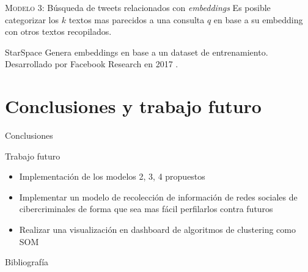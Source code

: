 \documentclass[10pt]{beamer}
\begin{document}
\begin{frame}{\textsc{Modelo 3:} Búsqueda de tweets relacionados con \emph{embeddings}}
  Es posible categorizar los $k$ textos mas parecidos a una consulta $q$ en base a su embedding con otros textos recopilados.

  \begin{alertblock}{StarSpace}
    Genera embeddings en base a un dataset de entrenamiento. Desarrollado por Facebook Research en 2017 \cite{starspace}. 
  \end{alertblock}
\end{frame}

\section{Conclusiones y trabajo futuro}

\begin{frame}{Conclusiones}
\end{frame}

\begin{frame}{Trabajo futuro}
  \begin{itemize}
  \item Implementación de los modelos 2, 3, 4 propuestos
  \item Implementar un modelo de recolección de información de redes sociales de cibercriminales de forma que sea mas fácil perfilarlos contra futuros
  \item Realizar una visualización en dashboard de algoritmos de clustering como \textsc{SOM}
  \end{itemize}
\end{frame}

\appendix
{}
\begin{frame}[allowframebreaks]{Bibliografía}

  
  

\end{frame}
\end{document}
